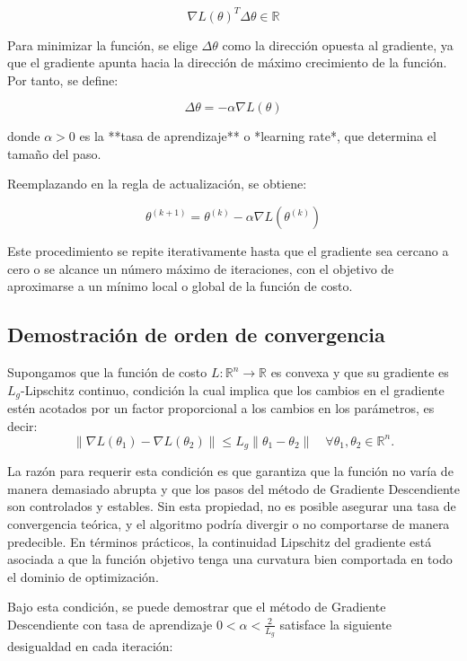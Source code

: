 \documentclass[12pt, letterpaper,conference]{IEEEtran}
\begin{document}
\[
\nabla L(\theta)^T \Delta \theta \in \mathbb{R}
\]

Para minimizar la función, se elige \( \Delta \theta \) como la dirección opuesta al gradiente, ya que el gradiente apunta hacia la dirección de máximo crecimiento de la función. Por tanto, se define:

\[
\Delta \theta = -\alpha \nabla L(\theta)
\]

donde \( \alpha > 0 \) es la **tasa de aprendizaje** o *learning rate*, que determina el tamaño del paso.

Reemplazando en la regla de actualización, se obtiene:

\[
\theta^{(k+1)} = \theta^{(k)} - \alpha \nabla L(\theta^{(k)})
\]

Este procedimiento se repite iterativamente hasta que el gradiente sea cercano a cero o se alcance un número máximo de iteraciones, con el objetivo de aproximarse a un mínimo local o global de la función de costo.


\vspace{0.25cm}

\subsection{Demostración de orden de convergencia}

Supongamos que la función de costo \( L: \mathbb{R}^n \rightarrow \mathbb{R} \) es convexa y que su gradiente es \( L_g \)-Lipschitz continuo, condición la cual implica que los cambios en el gradiente estén acotados por un factor proporcional a los cambios en los parámetros, es decir:
\[
\| \nabla L(\theta_1) - \nabla L(\theta_2) \| \leq L_g \| \theta_1 - \theta_2 \| \quad \forall \theta_1, \theta_2 \in \mathbb{R}^n.
\]

La razón para requerir esta condición es que garantiza que la función no varía de manera demasiado abrupta y que los pasos del método de Gradiente Descendiente son controlados y estables. Sin esta propiedad, no es posible asegurar una tasa de convergencia teórica, y el algoritmo podría divergir o no comportarse de manera predecible. En términos prácticos, la continuidad Lipschitz del gradiente está asociada a que la función objetivo tenga una curvatura bien comportada en todo el dominio de optimización.

Bajo esta condición, se puede demostrar que el método de Gradiente Descendiente con tasa de aprendizaje \( 0 < \alpha < \frac{2}{L_g} \) satisface la siguiente desigualdad en cada iteración:
\end{document}
